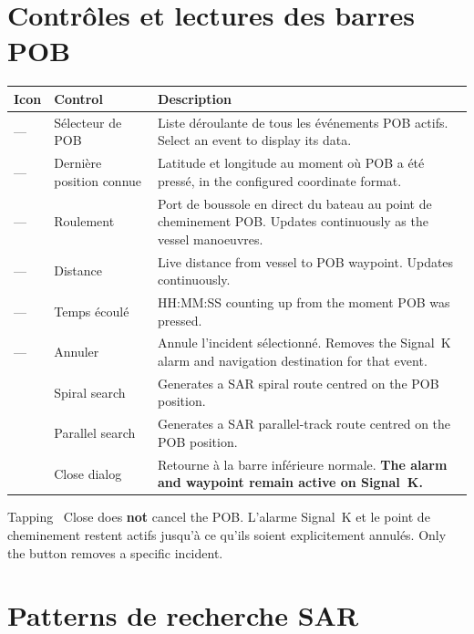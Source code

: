 \section{Contrôles et lectures des barres POB}

\begin{longtable}{C{1.4cm}L{3.0cm}L{9.3cm}}
\toprule
{}
\color{white}\sffamily\bfseries Icon &
\color{white}\sffamily\bfseries Control &
\color{white}\sffamily\bfseries Description \\
\midrule
---                      &Sélecteur de POB&
Liste déroulante de tous les événements POB actifs.
  Select an event to display its data. \\
---                      &Dernière position connue&
Latitude et longitude au moment où POB a été pressé,
  in the configured coordinate format. \\
---                      &Roulement&
Port de boussole en direct du bateau au point de cheminement POB.
  Updates continuously as the vessel manoeuvres. \\
---                      &Distance&
  Live distance from vessel to POB waypoint. Updates continuously. \\
---                      &Temps écoulé&
  HH:MM:SS counting up from the moment POB was pressed. \\
---                      &Annuler&
Annule l'incident sélectionné.
  Removes the Signal~K alarm and navigation destination for that event. \\
   & Spiral search    &
  Generates a SAR spiral route centred on the POB position. \\
 & Parallel search  &
  Generates a SAR parallel-track route centred on the POB position. \\
    & Close dialog     &
Retourne à la barre inférieure normale.
  \textbf{The alarm and waypoint remain active on Signal~K.} \\
\bottomrule
\end{longtable}

\begin{warningbox}
Tapping ~Close does \textbf{not} cancel the POB.
L'alarme Signal~K et le point de cheminement restent actifs jusqu'à ce qu'ils soient explicitement annulés.
Only the  button removes a specific incident.
\end{warningbox}

\section{Patterns de recherche SAR}

